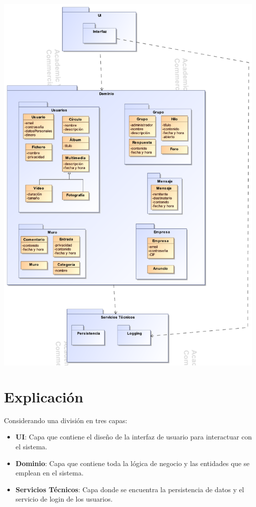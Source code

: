 \documentclass[12pt, a4paper, titlepage]{article}
\begin{document}
\begin{center}
	\includegraphics[width=\textwidth]{Imagenes/Arquitectura_logica}
\end{center}


\section{Explicación}

Considerando una división en tres capas:

\begin{itemize}
	\item \textbf{UI}: Capa que contiene el diseño de la interfaz de usuario para interactuar con el sistema.
	\item \textbf{Dominio}: Capa que contiene toda la lógica de negocio y las entidades que se emplean en el sistema.
	\item \textbf{Servicios Técnicos}: Capa donde se encuentra la persistencia de datos y el servicio de login de los usuarios.
\end{itemize}
\end{document}
